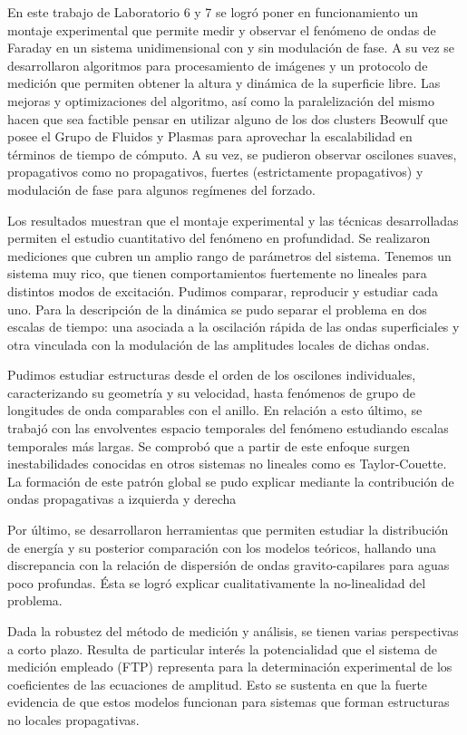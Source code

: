 \documentclass[../main.tex]{subfiles}
\begin{document}
En este trabajo de Laboratorio 6 y 7 se logró poner en funcionamiento un montaje experimental que permite medir y observar el fenómeno de ondas de Faraday en un sistema unidimensional con y sin modulación de fase. A su vez se desarrollaron algoritmos para procesamiento de imágenes y un protocolo de medición que permiten obtener la altura y dinámica de la superficie libre. Las mejoras y optimizaciones del algoritmo, así como la paralelización del mismo hacen que sea factible pensar en utilizar alguno de los dos clusters Beowulf que posee el Grupo de Fluidos y Plasmas para aprovechar la escalabilidad en términos de tiempo de cómputo. A su vez, se pudieron observar oscilones suaves, propagativos como no propagativos, fuertes (estrictamente propagativos) y modulación de fase para algunos regímenes del forzado.

Los resultados muestran que el montaje experimental y las técnicas desarrolladas permiten el estudio cuantitativo del fenómeno en profundidad. Se realizaron mediciones que cubren un amplio rango de parámetros del sistema. Tenemos un sistema muy rico, que tienen comportamientos fuertemente no lineales para distintos modos de excitación. Pudimos comparar, reproducir y estudiar cada uno.  Para la descripción de la dinámica se pudo  separar el problema en dos escalas de tiempo: una asociada a la oscilación rápida de las ondas superﬁciales y otra vinculada con la modulación de las amplitudes locales de dichas ondas. 

Pudimos estudiar estructuras desde el orden de los oscilones individuales, caracterizando su geometría y su velocidad, hasta fenómenos de grupo de longitudes de onda comparables con el anillo. En relación a esto último, se trabajó con las envolventes espacio temporales del fenómeno estudiando escalas temporales más largas. Se comprobó que a partir de este enfoque surgen inestabilidades conocidas en otros sistemas no lineales como es Taylor-Couette. La formación de este patrón global se pudo explicar mediante la contribución de ondas propagativas a izquierda y derecha


Por último, se desarrollaron herramientas que permiten estudiar la distribución de energía y su posterior comparación con los modelos teóricos, hallando una discrepancia con la relación de dispersión de ondas gravito-capilares para aguas poco profundas. Ésta se logró explicar cualitativamente la no-linealidad del problema.  

Dada la robustez del método de medición y análisis, se tienen varias perspectivas a corto plazo. Resulta de particular interés la potencialidad que el sistema de medición empleado (FTP) representa para la determinación experimental de los coeﬁcientes de las ecuaciones de amplitud. Esto se sustenta en que la fuerte evidencia de que estos modelos funcionan para sistemas que forman estructuras no locales propagativas. 
\end{document}

